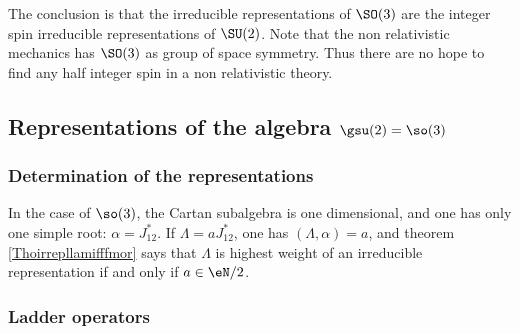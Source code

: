 \label{pg:reprez_SO3}The conclusion is that the irreducible representations of $\SO(3)$ are the integer spin irreducible representations of $\SU(2)$. Note that the non relativistic mechanics has $\SO(3)$ as group of space symmetry. Thus there are no hope to find any half integer spin in a non relativistic theory.


					\subsection{Representations of the algebra \texorpdfstring{$\gsu(2)=\so(3)$}{su2so3}}

					\subsubsection{Determination of the representations}

In the case of $\so(3)$, the Cartan subalgebra is one dimensional, and one has only one simple root: $\alpha=J_{12}^*$. If $\Lambda=aJ_{12}^*$, one has $(\Lambda,\alpha)=a$, and theorem \ref{Thoirrepllamifffmor} says that $\Lambda$ is highest weight of an irreducible representation if and only if $a\in \eN/2$.

					\subsubsection{Ladder operators}

